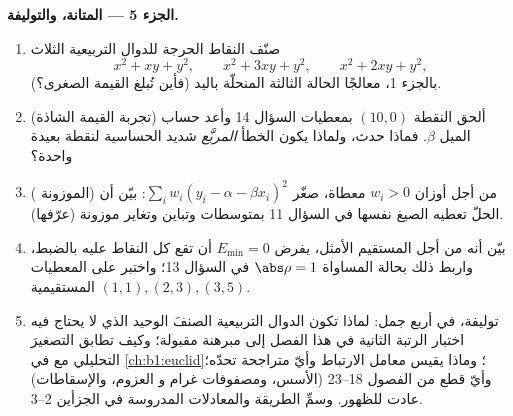 \begin{problem}
\medskip
\noindent\textbf{الجزء 5 --- المتانة، والتوليفة.}
\begin{enumerate}[resume]
  \item صنّف النقاط الحرجة للدوال التربيعية الثلاث
        \[
        x^2 + xy + y^2, \qquad x^2 + 3xy + y^2, \qquad
        x^2 + 2xy + y^2 ,
        \]
        بالجزء 1، معالجًا الحالة الثالثة المنحلّة باليد
        (فأين تُبلغ القيمة الصغرى؟).
  \item (تجربة القيمة الشاذة) ألحق النقطة $(10, 0)$ بمعطيات
        السؤال 14 وأعد حساب الميل $\beta$.
        فماذا حدث، ولماذا يكون الخطأ \emph{المربَّع} شديد
        الحساسية لنقطة بعيدة واحدة؟
  \item ( الموزونة) من أجل أوزان $w_i > 0$ معطاة،
        صغّر $\sum_i w_i(y_i - \alpha - \beta x_i)^2$: بيّن
        أن الحلّ تعطيه الصيغ نفسها في السؤال
        11 بمتوسطات وتباين وتغاير موزونة
        (عرّفها).
  \item بيّن أنه من أجل المستقيم الأمثل، يفرض $E_{\min} = 0$
        أن تقع كل النقاط عليه بالضبط، واربط ذلك بحالة
        المساواة $\abs\rho = 1$ في السؤال 13؛ واختبر على
        المعطيات المستقيمية $(1,1), (2,3), (3,5)$.
  \item توليفة، في أربع جمل: لماذا تكون الدوال التربيعية
        الصنفَ الوحيد الذي لا يحتاج فيه اختبار الرتبة الثانية
        في هذا الفصل إلى مبرهنة مقبولة؛ وكيف تطابق 
        التصغيرَ التحليلي مع  في \cref{ch:b1:euclid}؛ وماذا يقيس معامل
        الارتباط وأيّ متراجحة تحدّه؛
        وأيّ قطع من الفصول 18--23 (الأسس، ومصفوفات غرام و
        العزوم، والإسقاطات) عادت للظهور. وسمِّ
        الطريقة والمعادلات المدروسة في الجزأين 2--3.
\end{enumerate}
\end{problem}
